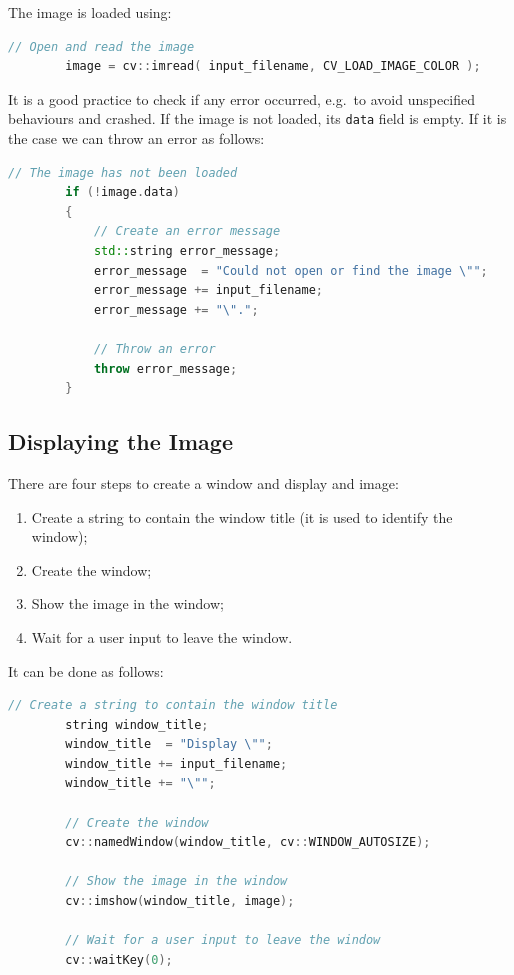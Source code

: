 \documentclass[english,a4paper,12pt,oneside]{article}
\begin{document}
The image is loaded using:
 \begin{lstlisting}[language=c++,caption=Open an image.]
        // Open and read the image
        image = cv::imread( input_filename, CV_LOAD_IMAGE_COLOR );
\end{lstlisting}

It is a good practice to check if any error occurred, e.g.~to avoid unspecified behaviours and crashed. 
If the image is not loaded, its \verb+data+ field is empty. 
If it is the case we can throw an error as follows:
 \begin{lstlisting}[language=c++,caption=Check that the image contains data]
        // The image has not been loaded
        if (!image.data)
        {
            // Create an error message
            std::string error_message;
            error_message  = "Could not open or find the image \"";
            error_message += input_filename;
            error_message += "\".";

            // Throw an error
            throw error_message;
        }
\end{lstlisting}


\subsection{Displaying the Image}

There are four steps to create a window and display and image:
\begin{enumerate}
 \item Create a string to contain the window title (it is used to identify the window);
 \item Create the window;
 \item Show the image in the window;
 \item Wait for a user input to leave the window.
\end{enumerate}

It can be done as follows:
\begin{lstlisting}[language=c++,caption=Create an image.]
        // Create a string to contain the window title
        string window_title;
        window_title  = "Display \"";
        window_title += input_filename;
        window_title += "\"";

        // Create the window
        cv::namedWindow(window_title, cv::WINDOW_AUTOSIZE);

        // Show the image in the window
        cv::imshow(window_title, image);

        // Wait for a user input to leave the window
        cv::waitKey(0);
\end{lstlisting}
\end{document}
